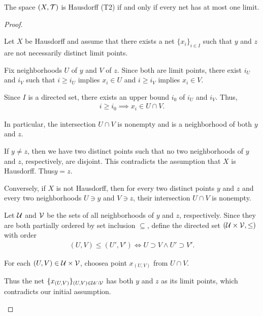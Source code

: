 \begin{proposition}\label{thm:t2_iff_singleton_limits}
  The space $(X, \mathcal T)$ is Hausdorff (T2) if and only if every net has at most one limit.
\end{proposition}
\begin{proof}
  \begin{description}
    \Implies Let $X$ be Hausdorff and assume that there exists a net $\{ x_i \}_{i \in I}$ such that $y$ and $z$ are not necessarily distinct limit points.

    Fix neighborhoods $U$ of $y$ and $V$ of $z$. Since both are limit points, there exist $i_U$ and $i_V$ such that $i \geq i_U$ implies $x_i \in U$ and $i \geq i_V$ implies $x_i \in V$.

    Since $I$ is a directed set, there exists an upper bound $i_0$ of $i_U$ and $i_V$. Thus,
    \begin{align*}
      i \geq i_0 \implies x_i \in U \cap V.
    \end{align*}

    In particular, the intersection $U \cap V$ is nonempty and is a neighborhood of both $y$ and $z$.

    If $y \neq z$, then we have two distinct points such that no two neighborhoods of $y$ and $z$, respectively, are disjoint. This contradicts the assumption that $X$ is Hausdorff. Thus\LEM $y = z$.

    \ImpliedBy Conversely, if $X$ is not Hausdorff\LEM, then for every two distinct points $y$ and $z$ and every two neighborhoods $U \ni y$ and $V \ni z$, their intersection $U \cap V$ is nonempty.

    Let $\mathcal U$ and $\mathcal V$ be the sets of all neighborhoods of $y$ and $z$, respectively. Since they are both partially ordered by set inclusion $\subseteq$, define the directed set $(\mathcal U \times \mathcal V, \leq)$ with order
    \begin{align*}
      (U, V) \leq (U', V') \iff U \supset V \land U' \supset V'.
    \end{align*}

    For each $(U, V) \in \mathcal U \times \mathcal V$, choose\AOC a point $x_{(U, V)}$ from $U \cap V$.

    Thus the net $\{ x_{(U, V)} \}_{(U, V) \in \mathcal U \cap \mathcal V}$ has both $y$ and $z$ as its limit points, which contradicts our initial assumption.
  \end{description}
\end{proof}
